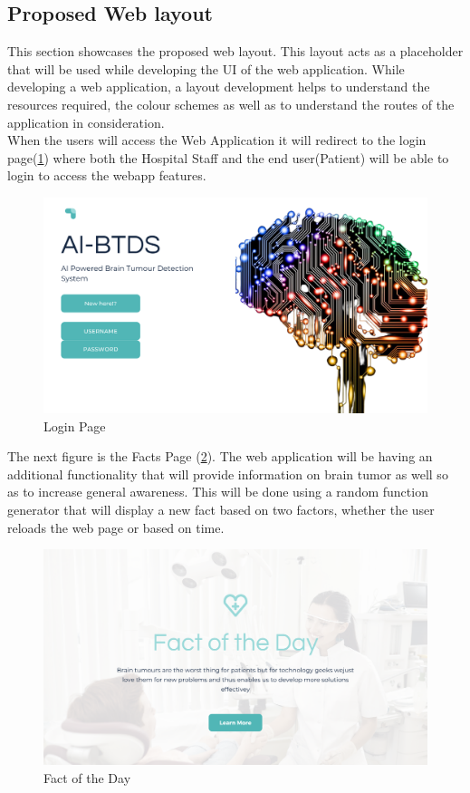 \subsection{Proposed Web layout}
This section showcases the proposed web layout. This layout acts as a placeholder that will be used while developing the UI of the web application. While developing a web application, a layout development helps to understand the resources required, the colour schemes as well as to understand the routes of the application in consideration. \\ 
When the users will access the Web Application it will redirect to the login page(\ref{fig:webapp_1}) where both the Hospital Staff and the end user(Patient) will be able to login to access the webapp features.
\begin{figure}[H]
\includegraphics[scale=0.45]{Photos/webapp_1.png}
\caption{Login Page} \label{fig:webapp_1}
\end{figure}
The next figure is the Facts Page (\ref{fig:webapp_2}). The web application will be having an additional functionality that will provide information on brain tumor as well so as to increase general awareness. This will be done using a random function generator that will display a new fact based on two factors, whether the user reloads the web page or based on time.
\begin{figure}[H]
\includegraphics[scale=0.45]{Photos/webapp_2.png}
\caption{Fact of the Day} \label{fig:webapp_2}
\end{figure}
